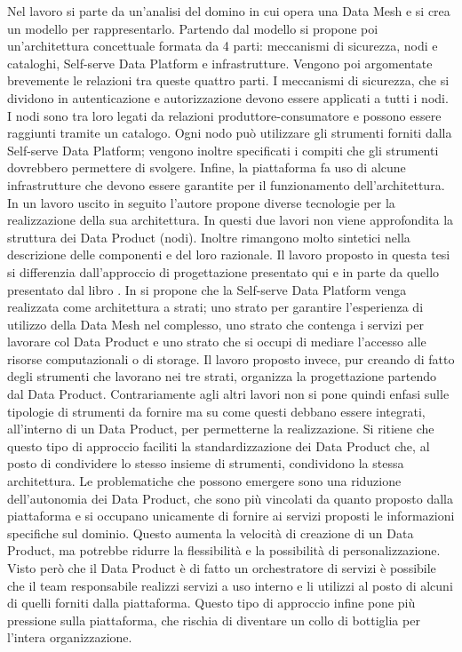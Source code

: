 \documentclass[a4paper,12pt]{report}
\begin{document}
Nel lavoro si parte da un'analisi del domino in cui opera una Data Mesh e si crea un modello per rappresentarlo.
Partendo dal modello si propone poi un'architettura concettuale formata da 4 parti: meccanismi di sicurezza, nodi e cataloghi, Self-serve Data Platform e infrastrutture.
Vengono poi argomentate brevemente le relazioni tra queste quattro parti. 
I meccanismi di sicurezza, che si dividono in autenticazione e autorizzazione devono essere applicati a tutti i nodi. 
I nodi sono tra loro legati da relazioni produttore-consumatore e possono essere raggiunti tramite un catalogo. 
Ogni nodo può utilizzare gli strumenti forniti dalla Self-serve Data Platform; vengono inoltre specificati i compiti che gli strumenti dovrebbero permettere di svolgere.
Infine, la piattaforma fa uso di alcune infrastrutture che devono essere garantite per il funzionamento dell'architettura.
In un lavoro uscito in seguito \cite{araujo2022advancing} l'autore propone diverse tecnologie per la realizzazione della sua architettura.
In questi due lavori non viene approfondita la struttura dei Data Product (nodi). 
Inoltre rimangono molto sintetici nella descrizione delle componenti e del loro razionale.
Il lavoro proposto in questa tesi si differenzia dall'approccio di progettazione presentato qui e in parte da quello presentato dal libro \cite{dehghani_data_2022}.
In \cite{dehghani_data_2022} si propone che la Self-serve Data Platform venga realizzata come architettura a strati; uno strato per garantire l'esperienza di utilizzo della Data Mesh nel complesso, uno strato che contenga i servizi per lavorare col Data Product e uno strato che si occupi di mediare l'accesso alle risorse computazionali o di storage.
Il lavoro proposto invece, pur creando di fatto degli strumenti che lavorano nei tre strati, organizza la progettazione partendo dal Data Product. 
Contrariamente agli altri lavori non si pone quindi enfasi sulle tipologie di strumenti da fornire ma su come questi debbano essere integrati, all'interno di un Data Product, per permetterne la realizzazione.
Si ritiene che questo tipo di approccio faciliti la standardizzazione dei Data Product che, al posto di condividere lo stesso insieme di strumenti, condividono la stessa architettura.
Le problematiche che possono emergere sono una riduzione dell'autonomia dei Data Product, che sono più vincolati da quanto proposto dalla piattaforma e si occupano unicamente di fornire ai servizi proposti le informazioni specifiche sul dominio. 
Questo aumenta la velocità di creazione di un Data Product, ma potrebbe ridurre la flessibilità e la possibilità di personalizzazione.
Visto però che il Data Product è di fatto un orchestratore di servizi è possibile che il team responsabile realizzi servizi a uso interno e li utilizzi al posto di alcuni di quelli forniti dalla piattaforma.
Questo tipo di approccio infine pone più pressione sulla piattaforma, che rischia di diventare un collo di bottiglia per l'intera organizzazione.
\end{document}
